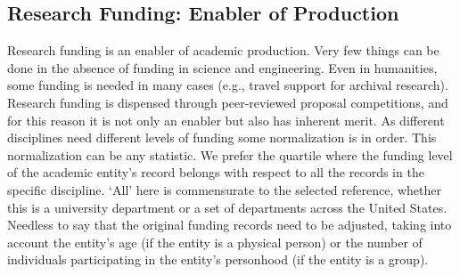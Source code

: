 \subsection {Research Funding: Enabler of Production}
Research funding is an enabler of academic production. Very few things can be done in the absence of funding in science and engineering. Even in humanities, some funding is needed in many cases (e.g., travel support for archival research).  Research funding is dispensed through peer-reviewed proposal competitions, and for this reason it is not only an enabler but also has inherent merit. As different disciplines need different levels of funding some normalization is in order. This normalization can be any statistic. We prefer the quartile where the funding level of the academic entity's record belongs with respect to all the records in the specific discipline.  `All' here is commensurate to the selected reference, whether this is a university department or a set of departments across the United States. Needless to say that the original funding records need to be adjusted, taking into account the entity's age (if the entity is a physical person) or the number of individuals participating in the entity's personhood (if the entity is a group). 

